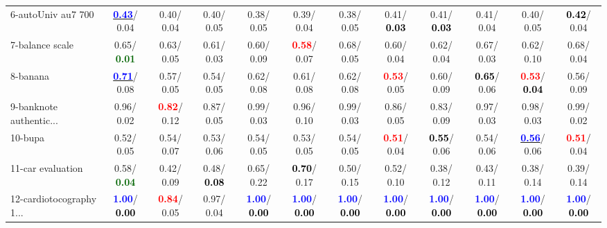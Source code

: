 \begin{table}[h]
\begin{center}
{\begin{tabular}{lc|c|c|c|c|c|c|c|c|c|c}
6-autoUniv au7 700 & \underline{\textcolor{blue}{\textbf{  0.43}}}/  0.04 &   0.40/  0.04 &   0.40/  0.05 &   0.38/  0.05 &   0.39/  0.04 &   0.38/  0.05 &   0.41/\textcolor{black}{\textbf{  0.03}} &   0.41/\textcolor{black}{\textbf{  0.03}} &   0.41/  0.04 &   0.40/  0.05 & \textcolor{black}{\textbf{  0.42}}/  0.04 \\
7-balance scale &   0.65/\textcolor{darkgreen}{\textbf{  0.01}} &   0.63/  0.05 &   0.61/  0.03 &   0.60/  0.09 & \textcolor{red}{\textbf{  0.58}}/  0.07 &   0.68/  0.05 &   0.60/  0.04 &   0.62/  0.04 &   0.67/  0.03 &   0.62/  0.10 &   0.68/  0.04 \\ \hline
8-banana & \underline{\textcolor{blue}{\textbf{  0.71}}}/  0.08 &   0.57/  0.05 &   0.54/  0.05 &   0.62/  0.08 &   0.61/  0.08 &   0.62/  0.08 & \textcolor{red}{\textbf{  0.53}}/  0.05 &   0.60/  0.09 & \textcolor{black}{\textbf{  0.65}}/  0.06 & \textcolor{red}{\textbf{  0.53}}/\textcolor{black}{\textbf{  0.04}} &   0.56/  0.09 \\
9-banknote authentic... &   0.96/  0.02 & \textcolor{red}{\textbf{  0.82}}/  0.12 &   0.87/  0.05 &   0.99/  0.03 &   0.96/  0.10 &   0.99/  0.03 &   0.86/  0.05 &   0.83/  0.09 &   0.97/  0.03 &   0.98/  0.03 &   0.99/  0.02 \\
10-bupa &   0.52/  0.05 &   0.54/  0.07 &   0.53/  0.06 &   0.54/  0.05 &   0.53/  0.05 &   0.54/  0.05 & \textcolor{red}{\textbf{  0.51}}/  0.04 & \textcolor{black}{\textbf{  0.55}}/  0.06 &   0.54/  0.06 & \underline{\textcolor{blue}{\textbf{  0.56}}}/  0.06 & \textcolor{red}{\textbf{  0.51}}/  0.04 \\
11-car evaluation &   0.58/\textcolor{darkgreen}{\textbf{  0.04}} &   0.42/  0.09 &   0.48/\textcolor{black}{\textbf{  0.08}} &   0.65/  0.22 & \textcolor{black}{\textbf{  0.70}}/  0.17 &   0.50/  0.15 &   0.52/  0.10 &   0.38/  0.12 &   0.43/  0.11 &   0.38/  0.14 &   0.39/  0.14 \\
12-cardiotocography 1... & \textcolor{blue}{\textbf{  1.00}}/\textcolor{black}{\textbf{  0.00}} & \textcolor{red}{\textbf{  0.84}}/  0.05 &   0.97/  0.04 & \textcolor{blue}{\textbf{  1.00}}/\textcolor{black}{\textbf{  0.00}} & \textcolor{blue}{\textbf{  1.00}}/\textcolor{black}{\textbf{  0.00}} & \textcolor{blue}{\textbf{  1.00}}/\textcolor{black}{\textbf{  0.00}} & \textcolor{blue}{\textbf{  1.00}}/\textcolor{black}{\textbf{  0.00}} & \textcolor{blue}{\textbf{  1.00}}/\textcolor{black}{\textbf{  0.00}} & \textcolor{blue}{\textbf{  1.00}}/\textcolor{black}{\textbf{  0.00}} & \textcolor{blue}{\textbf{  1.00}}/\textcolor{black}{\textbf{  0.00}} & \textcolor{blue}{\textbf{  1.00}}/\textcolor{black}{\textbf{  0.00}} \\

\end{tabular}}
\end{center}
\end{table}
